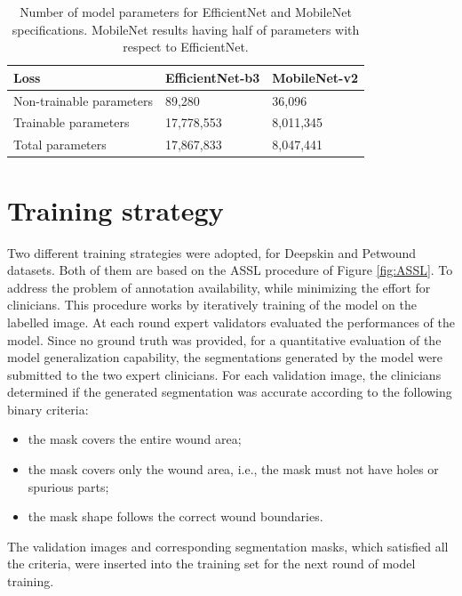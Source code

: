 \documentclass[../main.tex]{subfiles}
\begin{document}
\begin{table}[H]
    \centering
    \begin{tabular}{l|l|l|}
    
         Loss & EfficientNet-b3 & MobileNet-v2 \\ \hline
        Non-trainable parameters & 89,280 & 36,096 \\ \hline
        Trainable parameters & 17,778,553 & 8,011,345 \\ \hline
        Total parameters & 17,867,833 & 8,047,441 \\ \hline
    \end{tabular}
    \caption{Number of model parameters for EfficientNet and MobileNet specifications.  MobileNet results having half of parameters with respect to EfficientNet.}
    \label{tab:models-parameters}
\end{table}

\section{Training strategy}
Two different training strategies were adopted, for Deepskin and Petwound datasets. 
Both of them are based on the ASSL procedure of Figure \ref{fig:ASSL}.
To address the problem of annotation availability, while minimizing the effort for clinicians. 
This procedure works by iteratively training of the model on the labelled image.
At each round expert validators evaluated the performances of the model.
Since no ground truth was provided, for a quantitative evaluation of the model generalization capability, the segmentations generated by the model were submitted to the two expert clinicians. 
For each validation image, the clinicians determined if the generated segmentation was accurate according to the following binary criteria:
\begin{itemize}
    \item  the mask covers the entire wound area;
    \item the mask covers only the wound area, i.e., the mask must not have holes or spurious parts;
    \item the mask shape follows the correct wound boundaries.
\end{itemize}
The validation images and corresponding segmentation masks, which satisfied all the criteria, were inserted into the training set for the next round of model training.
\end{document}
